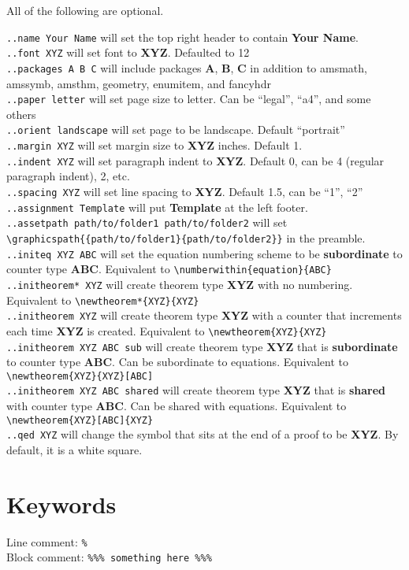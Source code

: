 \documentclass[12pt]{article}
\newcommand{\nl}{\\}
\renewcommand\bold{\textbf}
\numberwithin{equation}{section}
\begin{document}
\bigskip
\bigskip

All of the following are optional.

\verb|..name Your Name| will set the top right header to contain \bold{Your Name}. \nl
\verb|..font XYZ| will set font to \bold{XYZ}. Defaulted to 12 \nl
\verb|..packages A B C| will include packages \bold{A}, \bold{B}, \bold{C} in addition to amsmath, amssymb, amsthm, geometry, enumitem, and fancyhdr \nl
\verb|..paper letter| will set page size to letter. Can be ``legal'', ``a4'', and some others\nl
\verb|..orient landscape| will set page to be landscape. Default ``portrait''\nl
\bigskip
\verb|..margin XYZ| will set margin size to \bold{XYZ} inches. Default 1.\nl
\verb|..indent XYZ| will set paragraph indent to \bold{XYZ}. Default 0, can be 4 (regular paragraph indent), 2, etc. \nl
\verb|..spacing XYZ| will set line spacing to \bold{XYZ}. Default 1.5, can be ``1'', ``2''\nl
\verb|..assignment Template| will put \bold{Template} at the left footer. \nl
\verb|..assetpath path/to/folder1 path/to/folder2| will set \verb|\graphicspath{{path/to/folder1}{path/to/folder2}}| in the preamble. \nl
\bigskip
\verb|..initeq XYZ ABC| will set the equation numbering scheme to be \bold{subordinate} to counter type \bold{ABC}. Equivalent to \verb|\numberwithin{equation}{ABC}|\nl
\verb|..initheorem* XYZ| will create theorem type \bold{XYZ} with no numbering. Equivalent to \verb|\newtheorem*{XYZ}{XYZ}|\nl
\verb|..initheorem XYZ| will create theorem type \bold{XYZ} with a counter that increments each time \bold{XYZ} is created. Equivalent to \verb|\newtheorem{XYZ}{XYZ}|\nl
\verb|..initheorem XYZ ABC sub| will create theorem type \bold{XYZ} that is \bold{subordinate} to counter type \bold{ABC}. Can be subordinate to equations. Equivalent to \verb|\newtheorem{XYZ}{XYZ}[ABC]|\nl
\verb|..initheorem XYZ ABC shared| will create theorem type \bold{XYZ} that is \bold{shared} with counter type \bold{ABC}. Can be shared with equations. Equivalent to \verb|\newtheorem{XYZ}[ABC]{XYZ}|\nl
\verb|..qed XYZ| will change the symbol that sits at the end of a proof to be \bold{XYZ}. By default, it is a white square.

\newpage

\section{Keywords}

Line comment: \verb|%|\nl
Block comment: \verb|%|\verb|%|\verb|%|\verb| something here |\verb|%|\verb|%|\verb|%|
\end{document}

